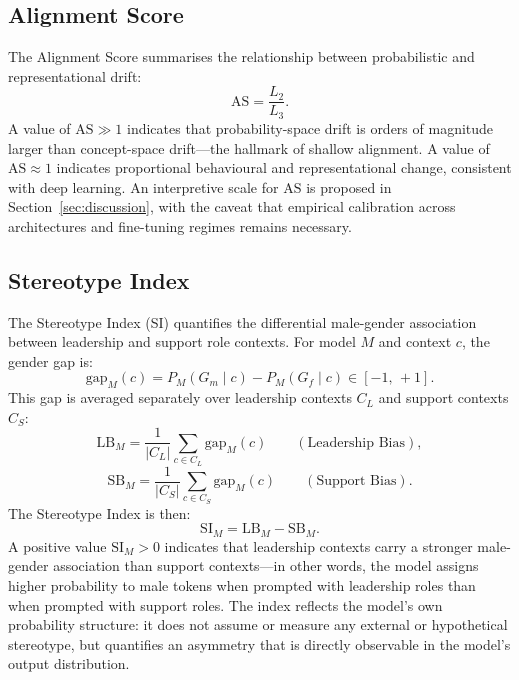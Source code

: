 \documentclass[11pt,a4paper]{article}
\newcommand{\Gm}{G_m}
\newcommand{\Gf}{G_f}
\newcommand{\AS}{\mathrm{AS}}
\begin{document}
\subsection{Alignment Score}

The Alignment Score summarises the relationship between probabilistic and representational
drift:
\begin{equation}
  \AS = \frac{L_2}{L_3}.
  \label{eq:AS}
\end{equation}
A value of $\AS \gg 1$ indicates that probability-space drift is orders of magnitude
larger than concept-space drift---the hallmark of shallow alignment. A value of
$\AS \approx 1$ indicates proportional behavioural and representational change,
consistent with deep learning. An interpretive scale for $\AS$ is proposed in
Section~\ref{sec:discussion}, with the caveat that empirical calibration across
architectures and fine-tuning regimes remains necessary.

\subsection{Stereotype Index}

The Stereotype Index (SI) quantifies the differential male-gender association between
leadership and support role contexts. For model $M$ and context $c$, the gender gap is:
\[
  \mathrm{gap}_M(c) = P_M(\Gm \mid c) - P_M(\Gf \mid c) \in [-1,\, +1].
\]
This gap is averaged separately over leadership contexts $C_L$ and support contexts $C_S$:
\[
  \mathrm{LB}_M = \frac{1}{|C_L|} \sum_{c \in C_L} \mathrm{gap}_M(c)
    \qquad (\text{Leadership Bias}),
\]
\[
  \mathrm{SB}_M = \frac{1}{|C_S|} \sum_{c \in C_S} \mathrm{gap}_M(c)
    \qquad (\text{Support Bias}).
\]
The Stereotype Index is then:
\[
  \mathrm{SI}_M = \mathrm{LB}_M - \mathrm{SB}_M.
\]
A positive value $\mathrm{SI}_M > 0$ indicates that leadership contexts carry a stronger
male-gender association than support contexts---in other words, the model assigns higher
probability to male tokens when prompted with leadership roles than when prompted with
support roles. The index reflects the model's own probability structure: it does not
assume or measure any external or hypothetical stereotype, but quantifies an asymmetry
that is directly observable in the model's output distribution.
\end{document}
